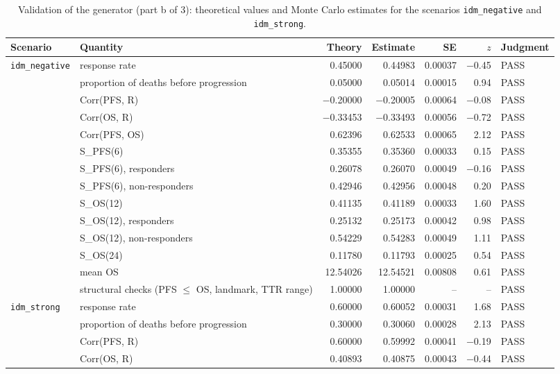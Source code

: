 \begin{table}[htbp]
\centering
\caption{Validation of the generator (part b of 3): theoretical values and Monte Carlo estimates for the scenarios \texttt{idm\_negative} and \texttt{idm\_strong}.}
\label{tab:generatorb}
\begin{threeparttable}
\scriptsize\setlength{\tabcolsep}{3pt}
\begin{tabular}{p{2.4cm}p{4.2cm}rrrrl}
\toprule
Scenario & Quantity & Theory & Estimate & SE & $z$ & Judgment \\
\midrule
\texttt{idm\_negative} & response rate & 0.45000 & 0.44983 & 0.00037 & $-$0.45 & PASS \\
 & proportion of deaths before progression & 0.05000 & 0.05014 & 0.00015 & 0.94 & PASS \\
 & Corr(PFS, R) & $-$0.20000 & $-$0.20005 & 0.00064 & $-$0.08 & PASS \\
 & Corr(OS, R) & $-$0.33453 & $-$0.33493 & 0.00056 & $-$0.72 & PASS \\
 & Corr(PFS, OS) & 0.62396 & 0.62533 & 0.00065 & 2.12 & PASS \\
 & S\_PFS(6) & 0.35355 & 0.35360 & 0.00033 & 0.15 & PASS \\
 & S\_PFS(6), responders & 0.26078 & 0.26070 & 0.00049 & $-$0.16 & PASS \\
 & S\_PFS(6), non-responders & 0.42946 & 0.42956 & 0.00048 & 0.20 & PASS \\
 & S\_OS(12) & 0.41135 & 0.41189 & 0.00033 & 1.60 & PASS \\
 & S\_OS(12), responders & 0.25132 & 0.25173 & 0.00042 & 0.98 & PASS \\
 & S\_OS(12), non-responders & 0.54229 & 0.54283 & 0.00049 & 1.11 & PASS \\
 & S\_OS(24) & 0.11780 & 0.11793 & 0.00025 & 0.54 & PASS \\
 & mean OS & 12.54026 & 12.54521 & 0.00808 & 0.61 & PASS \\
 & structural checks (PFS $\le$ OS, landmark, TTR range) & 1.00000 & 1.00000 & -- & -- & PASS \\
\midrule
\texttt{idm\_strong} & response rate & 0.60000 & 0.60052 & 0.00031 & 1.68 & PASS \\
 & proportion of deaths before progression & 0.30000 & 0.30060 & 0.00028 & 2.13 & PASS \\
 & Corr(PFS, R) & 0.60000 & 0.59992 & 0.00041 & $-$0.19 & PASS \\
 & Corr(OS, R) & 0.40893 & 0.40875 & 0.00043 & $-$0.44 & PASS \\

\end{tabular}
\end{threeparttable}
\end{table}

